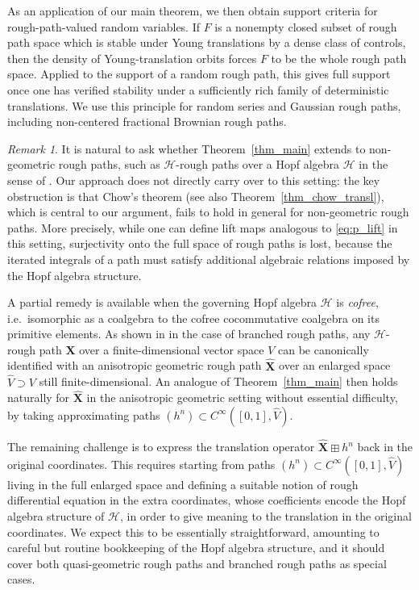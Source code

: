 \documentclass[12pt,a4paper]{article}
\numberwithin{equation}{section}
\theoremstyle{plain}
\theoremstyle{definition}
\theoremstyle{remark}
\newtheorem{remark}[theorem]{Remark}
\begin{document}
As an application of our main theorem, we then obtain support criteria for rough-path-valued random variables. If \(F\) is a nonempty closed subset of rough path space which is stable under Young translations by a dense class of controls, then the density of Young-translation orbits forces \(F\) to be the whole rough path space. Applied to the support of a random rough path, this gives full support once one has verified stability under a sufficiently rich family of deterministic translations. We use this principle for random series and Gaussian rough paths, including non-centered fractional Brownian rough paths.

\begin{remark}
It is natural to ask whether Theorem~\ref{thm_main} extends to non-geometric 
rough paths, such as $\mathcal{H}$-rough paths over a Hopf algebra $\mathcal{H}$ 
in the sense of \cite{Tapia2018}. Our approach does not directly carry over to 
this setting: the key obstruction is that Chow's theorem 
\cite[Theorem~7.28]{frizbook} (see also Theorem~\ref{thm_chow_transl}), which 
is central to our argument, fails to hold in general for non-geometric rough 
paths. More precisely, while one can define lift maps analogous to 
\eqref{eq:p_lift} in this setting, surjectivity onto the full space of rough 
paths is lost, because the iterated integrals of a path must satisfy additional 
algebraic relations imposed by the Hopf algebra structure.

A partial remedy is available when the governing Hopf algebra $\mathcal{H}$ is 
\emph{cofree}, i.e.\ isomorphic as a coalgebra to the cofree cocommutative 
coalgebra on its primitive elements. As shown in \cite{Bel26} in the case of 
branched rough paths, any $\mathcal{H}$-rough path $\mathbf{X}$ over a 
finite-dimensional vector space $V$ can be canonically identified with an 
anisotropic geometric rough path $\widehat{\mathbf{X}}$ over an enlarged space 
$\widehat{V} \supset V$ still finite-dimensional. An analogue of Theorem~\ref{thm_main} then holds 
naturally for $\widehat{\mathbf{X}}$ in the anisotropic geometric setting 
without essential difficulty, by taking approximating paths 
$(h^n) \subset C^{\infty}([0,1], \widehat{V})$.

The remaining challenge is to express the translation operator 
$\widehat{\mathbf{X}} \boxplus h^n$ back in the original coordinates. This 
requires starting from paths $(h^n) \subset C^{\infty}([0,1], \widehat{V})$ 
living in the full enlarged space and defining a suitable notion of rough 
differential equation in the extra coordinates, whose coefficients encode 
the Hopf algebra structure of $\mathcal{H}$, in order to give meaning to 
the translation in the original coordinates. We expect this to be essentially straightforward, amounting to careful but routine bookkeeping of the Hopf 
algebra structure, and it should cover both quasi-geometric rough paths \cite{Bel23} and branched rough paths as special cases.
\end{remark}
\end{document}
